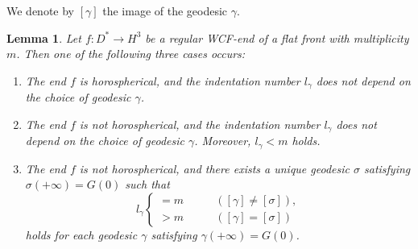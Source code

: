 \documentclass[a4paper]{amsart}
\theoremstyle{plain}
\newtheorem{lemma}[theorem]{Lemma}
\theoremstyle{remark}
\numberwithin{equation}{section}
\begin{document}
We denote by $[\gamma]$ the image of the geodesic $\gamma$.
\begin{lemma}\label{lem:indentation}
 Let $f\colon{}D^*\to H^3$ be a regular WCF-end of a flat front
 with multiplicity $m$.
 Then one of the following three cases 
occurs{\rm:}
 \begin{enumerate}
 \item\label{item:indent:0} 
      The end $f$ is horospherical, and the indentation number
      $l_{\gamma}$ does not depend on the choice of geodesic
      $\gamma$.
 \item\label{item:indent:1}
      The end $f$ is not horospherical, and
      the indentation number 
      $l_{\gamma}$ does not depend on the choice of geodesic
      $\gamma$.  Moreover, $l_{\gamma}<m$ holds.
  \item\label{item:indent:2} 
       The end $f$ is not horospherical, and 
       there exists a unique geodesic $\sigma$ 
       satisfying $\sigma(+\infty)=G(0)$
       such that 
       \[
         l_\gamma \begin{cases} 
		   =m \qquad& 
		   ([\gamma]\ne [\sigma]), \\
		   >m \qquad& 
		   ([\gamma]  = [\sigma]) 
		\end{cases}
       \]
       holds for each geodesic $\gamma$ satisfying
 $\gamma(+\infty)=G(0)$.
 \end{enumerate}
\end{lemma}
\end{document}
